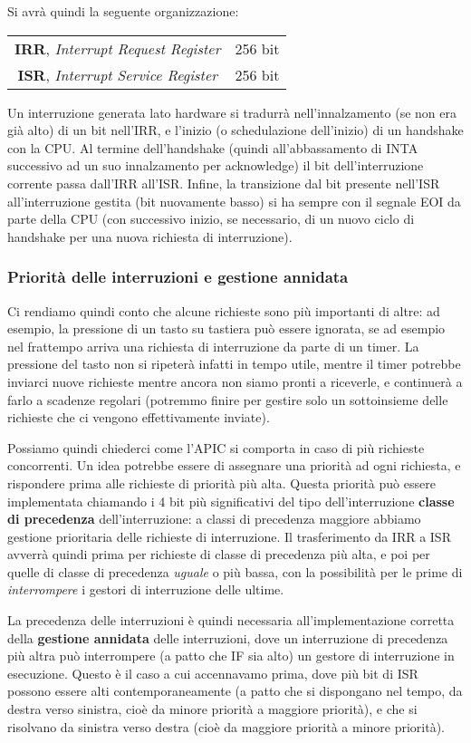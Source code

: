 \documentclass[a4paper,11pt]{article}
\begin{document}
Si avrà quindi la seguente organizzazione:
\begin{table}[h!]
	\center 
	\begin{tabular} { c | c  }
		\textbf{IRR}, \textit{Interrupt Request Register} & 256 bit \\
		\textbf{ISR}, \textit{Interrupt Service Register} & 256 bit
	\end{tabular}
\end{table}

Un interruzione generata lato hardware si tradurrà nell'innalzamento (se non era già alto) di un bit nell'IRR, e l'inizio (o schedulazione dell'inizio) di un handshake con la CPU.
Al termine dell'handshake (quindi all'abbassamento di INTA successivo ad un suo innalzamento per acknowledge) il bit dell'interruzione corrente passa dall'IRR all'ISR.
Infine, la transizione dal bit presente nell'ISR all'interruzione gestita (bit nuovamente basso) si ha sempre con il segnale EOI da parte della CPU (con successivo inizio, se necessario, di un nuovo ciclo di handshake per una nuova richiesta di interruzione).

\subsubsection{Priorità delle interruzioni e gestione annidata}
Ci rendiamo quindi conto che alcune richieste sono più importanti di altre: ad esempio, la pressione di un tasto su tastiera può essere ignorata, se ad esempio nel frattempo arriva una richiesta di interruzione da parte di un timer.
La pressione del tasto non si ripeterà infatti in tempo utile, mentre il timer potrebbe inviarci nuove richieste mentre ancora non siamo pronti a riceverle, e continuerà a farlo a scadenze regolari (potremmo finire per gestire solo un sottoinsieme delle richieste che ci vengono effettivamente inviate).

Possiamo quindi chiederci come l'APIC si comporta in caso di più richieste concorrenti.
Un idea potrebbe essere di assegnare una priorità ad ogni richiesta, e rispondere prima alle richieste di priorità più alta.
Questa priorità può essere implementata chiamando i 4 bit più significativi del tipo dell'interruzione \textbf{classe di precedenza} dell'interruzione: a classi di precedenza maggiore abbiamo gestione prioritaria delle richieste di interruzione.
Il trasferimento da IRR a ISR avverrà quindi prima per richieste di classe di precedenza più alta, e poi per quelle di classe di precedenza \textit{uguale} o più bassa, con la possibilità per le prime di \textit{interrompere} i gestori di interruzione delle ultime.

La precedenza delle interruzioni è quindi necessaria all'implementazione corretta della \textbf{gestione annidata} delle interruzioni, dove un interruzione di precedenza più altra può interrompere (a patto che IF sia alto) un gestore di interruzione in esecuzione. 
Questo è il caso a cui accennavamo prima, dove più bit di ISR possono essere alti contemporaneamente (a patto che si dispongano nel tempo, da destra verso sinistra, cioè da minore priorità a maggiore priorità), e che si risolvano da sinistra verso destra (cioè da maggiore priorità a minore priorità).
\end{document}
